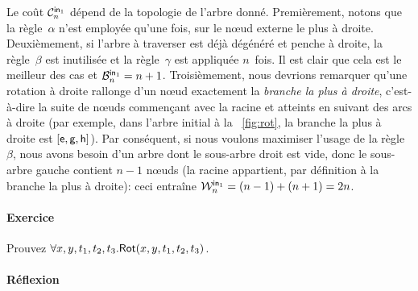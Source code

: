 Le coût \(\C{\fun{in}_1}{n}\) dépend de
la topologie de l'arbre donné. Premièrement, notons que la
règle~\(\alpha\) n'est employée qu'une fois, sur le n{\oe}ud externe
le plus à droite. Deuxièmement, si l'arbre à traverser est déjà
dégénéré et penche à droite, la
règle~\(\beta\) est inutilisée et la règle~\(\gamma\) est appliquée
\(n\)~fois. Il est clair que cela est le meilleur des cas et
\(\B{\fun{in}_1}{n} = n + 1\).
Troisièmement, nous devrions remarquer qu'une rotation à droite
rallonge d'un n{\oe}ud exactement la \emph{branche la plus à
  droite}, c'est-à-dire la suite de n{\oe}uds
commençant avec la racine et atteints en suivant des arcs à droite
(par exemple, dans l'arbre initial à la \fig~\vref{fig:rot}, la
branche la plus à droite est \([\fun{e}, \fun{g},
\fun{h}]\)). Par conséquent, si nous voulons maximiser l'usage de la
règle~\(\beta\), nous avons besoin d'un arbre dont le sous-arbre droit
est vide, donc le sous-arbre gauche contient \(n-1\) n{\oe}uds (la
racine appartient, par définition à la branche la plus à droite): ceci
entraîne \(\W{\fun{in}_1}{n} = (n-1) + (n+1) =
2n\).

\paragraph{Exercice}

Prouvez \(\forall x,y,t_1,t_2,t_3.\pred{Rot}{x,y,t_1,t_2,t_3}\).

\paragraph{Réflexion}

